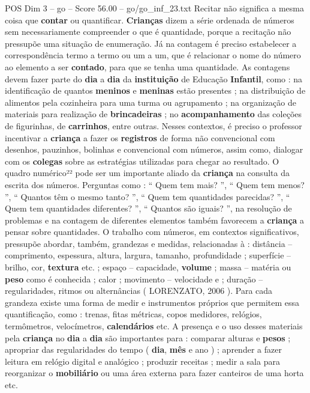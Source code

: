 \begin{textsample}{POS Dim 3 – go – Score 56.00 – go/go\_inf\_23.txt}
Recitar não significa a mesma coisa que \textbf{contar} ou quantificar. \textbf{Crianças} dizem a série ordenada de números sem necessariamente compreender o que é quantidade, porque a recitação não pressupõe uma situação de enumeração.
Já na contagem é preciso estabelecer a correspondência termo a termo ou um a um, que é relacionar o nome do número ao elemento a ser \textbf{contado}, para que se tenha uma quantidade.
As contagens devem fazer parte do \textbf{dia} a \textbf{dia} da \textbf{instituição} de Educação \textbf{Infantil}, como : na identificação de quantos \textbf{meninos} e \textbf{meninas} estão presentes ; na distribuição de alimentos pela cozinheira para uma turma ou agrupamento ; na organização de materiais para realização de \textbf{brincadeiras} ; no \textbf{acompanhamento} das coleções de figurinhas, de \textbf{carrinhos}, entre outras.
Nesses contextos, é preciso o professor incentivar a \textbf{criança} a fazer os \textbf{registros} de forma não convencional com desenhos, pauzinhos, bolinhas e convencional com números, assim como, dialogar com os \textbf{colegas} sobre as estratégias utilizadas para chegar ao resultado.
O quadro numérico²² pode ser um importante aliado da \textbf{criança} na consulta da escrita dos números.
Perguntas como : “ Quem tem mais? ”, “ Quem tem menos? ”, “ Quantos têm o mesmo tanto? ”, “ Quem tem quantidades parecidas? ”, “ Quem tem quantidades diferentes? ”, “ Quantos são iguais? ”, na resolução de problemas e na contagem de diferentes elementos também favorecem a \textbf{criança} a pensar sobre quantidades.
O trabalho com números, em contextos significativos, pressupõe abordar, também, grandezas e medidas, relacionadas à : distância – comprimento, espessura, altura, largura, tamanho, profundidade ; superfície – brilho, cor, \textbf{textura} etc. ; espaço – capacidade, \textbf{volume} ; massa – matéria ou \textbf{peso} como é conhecida ; calor ; movimento – velocidade e ; duração – regularidades, ritmos ou alternâncias ( LORENZATO, 2006 ).
Para cada grandeza existe uma forma de medir e instrumentos próprios que permitem essa quantificação, como : trenas, fitas métricas, copos medidores, relógios, termômetros, velocímetros, \textbf{calendários} etc.
A presença e o uso desses materiais pela \textbf{criança} no \textbf{dia} a \textbf{dia} são importantes para : comparar alturas e \textbf{pesos} ; apropriar das regularidades do tempo ( \textbf{dia}, \textbf{mês} e ano ) ; aprender a fazer leitura em relógio digital e analógico ; produzir receitas ; medir a sala para reorganizar o \textbf{mobiliário} ou uma área externa para fazer canteiros de uma horta etc.

\end{textsample}

